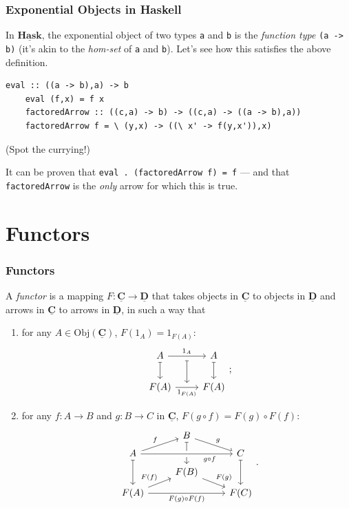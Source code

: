 \documentclass[10pt]{beamer}
\newcommand{\Cat}[1]{\ensuremath{\underline{\mathbf{#1}}}}
\newcommand{\Obj}[1]{\ensuremath{\mathrm{Obj}(\Cat{#1})}}
\theoremstyle{definition}
\theoremstyle{remark}
\numberwithin{equation}{section}
\begin{document}
\begin{frame}
  \frametitle{Exponential Objects in Haskell}

  In $\Cat{Hask}$, the exponential object of two types \lstinline{a} and
  \lstinline{b} is the \emph{function type} \lstinline{(a -> b)} (it's akin to
  the \emph{hom-set} of \lstinline{a} and \lstinline{b}). Let's see
  how this satisfies the above definition.

  \begin{lstlisting}[frame=single]
    eval :: ((a -> b),a) -> b
    eval (f,x) = f x
    factoredArrow :: ((c,a) -> b) -> ((c,a) -> ((a -> b),a))
    factoredArrow f = \ (y,x) -> ((\ x' -> f(y,x')),x)
  \end{lstlisting}
  {\footnotesize{(Spot the currying!)}}

  It can be proven that \lstinline{eval . (factoredArrow f) = f} --- and that
  \lstinline{factoredArrow} is the \emph{only} arrow for which this is true.

\end{frame}

\section{Functors}

\begin{frame}[fragile]
  \frametitle{Functors}

  A \emph{functor} is a mapping $F\colon \Cat{C} \rightarrow \Cat{D}$ that takes objects in
  $\Cat{C}$ to objects in $\Cat{D}$ and arrows in $\Cat{C}$ to arrows in
  $\Cat{D}$, in such a way that
  \begin{enumerate}
  \item for any $A \in \Obj{C}$, $F(1_A) = 1_{F(A)}$:
    \[
      \begin{tikzcd}
        A \arrow[mapsto]{d} \arrow[""' name = id]{r}{1_A} & A \arrow[mapsto]{d} \\
        F(A) \arrow[swap,""' name = Fid]{r}{1_{F(A)}} & F(A) \arrow[mapsto,from=id,to=Fid]
      \end{tikzcd}\rlap{;}
    \]
  \item for any $f\colon A \rightarrow B$ and $g\colon B \rightarrow C$ in $\Cat{C}$, $F(g \circ f) =
    F(g) \circ F(f)$:
    \[
      \begin{tikzcd}[row sep=tiny]
        & B \arrow[mapsto]{dd} \arrow{dr}{g} & \\
        A \arrow[mapsto]{dd} \arrow{ur}{f} \arrow[crossing over,swap,near end]{rr}{g \circ f} & & C \arrow[mapsto]{dd} \\
        & F(B) \arrow{dr}{F(g)} & \\
        F(A) \arrow{ur}{F(f)} \arrow[swap]{rr}{F(g) \circ F(f)} & & F(C)
      \end{tikzcd}\rlap{.}
    \]
  \end{enumerate}
\end{frame}
\end{document}
